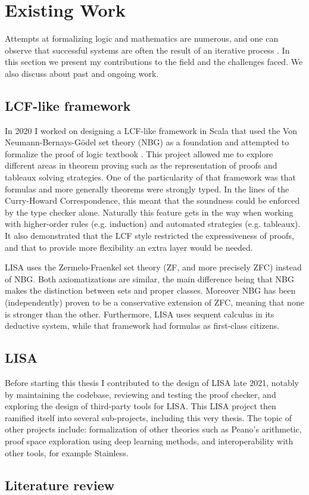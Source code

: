 \section{Existing Work}
\label{sec:existing-work}

Attempts at formalizing logic and mathematics are numerous, and one can observe that successful systems are often the result of an iterative process \cite{Paulson2019, Harrison2014}. In this section we present my contributions to the field and the challenges faced. We also discuss about past and ongoing work.

\subsection{LCF-like framework}

In 2020 I worked on designing a LCF-like framework in Scala that used the Von Neumann-Bernays-Gödel set theory (NBG) as a foundation \cite{Cassayre2020} and attempted to formalize the proof of logic textbook \cite{Mendelson2015}. This project allowed me to explore different areas in theorem proving such as the representation of proofs and tableaux solving strategies. One of the particularity of that framework was that formulas and more generally theorems were strongly typed. In the lines of the Curry-Howard Correspondence, this meant that the soundness could be enforced by the type checker alone. Naturally this feature gets in the way when working with higher-order rules (e.g. induction) and automated strategies (e.g. tableaux). It also demonstrated that the LCF style restricted the expressiveness of proofs, and that to provide more flexibility an extra layer would be needed.

LISA uses the Zermelo-Fraenkel set theory (ZF, and more precisely ZFC) instead of NBG. Both axiomatizations are similar, the main difference being that NBG makes the distinction between sets and proper classes. Moreover NBG has been (independently) proven to be a conservative extension of ZFC, meaning that none is stronger than the other. Furthermore, LISA uses sequent calculus in its deductive system, while that framework had formulas as first-class citizens.

\subsection{LISA}

Before starting this thesis I contributed to the design of LISA late 2021, notably by maintaining the codebase, reviewing and testing the proof checker, and exploring the design of third-party tools for LISA. This LISA project then ramified itself into several sub-projects, including this very thesis. The topic of other projects include: formalization of other theories such as Peano's arithmetic, proof space exploration using deep learning methods, and interoperability with other tools, for example Stainless.

\subsection{Literature review}

\cite{Yushkovskiy2018}
